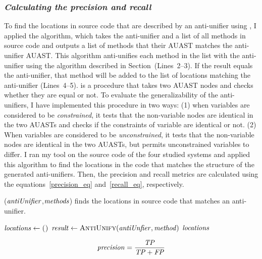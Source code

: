 \subsubsection{\emph{Calculating the precision and recall}}  \label{precision}
To find the locations in source code that are described by an anti-unifier using , I applied the  algorithm, which takes the anti-unifier and a list of all methods in source code and outputs a list of methods that their AUAST matches the anti-unifier AUAST. This algorithm anti-unifies each method in the list with the anti-unifier using the  algorithm described in Section~\label{meth-antiUnifier}(Lines~2--3). If the result equals the anti-unifier, that method will be added to the list of locations matching the anti-unifier (Lines~4--5).  is a procedure that takes two AUAST nodes and checks whether they are equal or not. To evaluate the generalizability of the anti-unifiers, I have implemented this procedure in two ways: (1) when variables are considered to be \emph{constrained}, it tests that the non-variable nodes are identical in the two AUASTs and checks if the constraints of variable are identical or not. (2) When variables are considered to be \emph{unconstrained}, it tests that the non-variable nodes are identical in the two AUASTs, but permits unconstrained variables to differ. I ran my tool on the source code of the four studied systems and applied this algorithm to find the locations in the code that matches the structure of the generated anti-unifiers. Then, the precision and recall metrics are calculated using the equations~\ref{precision_eq} and~\ref{recall_eq}, respectively.


\begin{algorithm}
\caption{($\mathit{antiUnifier}$,$\mathit{methods}$) finds the locations in source code that matches an anti-unifier.}
\label{alg-determine}
\begin{algorithmic}[1]
\DetermineLocations
    \State $\mathit{locations} \gets \textsc{()}$
    \State $\mathit{result} \gets  \textsc{AntiUnify}(\mathit{antiUnfier},\mathit{method})$
		\EndIf 		
		\EndFor
 \Return $\mathit{locations} $  	
  \end{algorithmic}
\end{algorithm}

\begin{equation}\label{precision_eq}
\mathit{precision} = \frac{\mathit{TP}}{{\mathit{TP}+\mathit{FP}}}
\end{equation}


